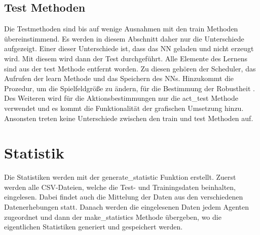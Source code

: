 \subsection{Test Methoden} \label{sec:Implementierung_test_Methode}
Die Testmethoden sind bis auf wenige Ausnahmen mit den train Methoden übereinstimmend. Es werden in diesem Abschnitt daher nur die Unterschiede aufgezeigt. Einer dieser Unterschiede ist, dass das NN geladen und nicht erzeugt wird. Mit diesem wird dann der Test durchgeführt. Alle Elemente des Lernens sind aus der test Methode entfernt worden. Zu diesen gehören der Scheduler, das Aufrufen der learn Methode und das Speichern des NNs.
Hinzukommt die Prozedur, um die Spielfeldgröße zu ändern, für die Bestimmung der Robustheit .
Des Weiteren wird für die Aktionsbestimmungen nur die act\_test Methode verwendet und es kommt die Funktionalität der grafischen Umsetzung hinzu.
Ansonsten treten keine Unterschiede zwischen den train und test Methoden auf.

\section{Statistik} \label{sec:Implementierung_Statistiken}
Die Statistiken werden mit der generate\_statistic Funktion erstellt.
Zuerst werden alle CSV-Dateien, welche die Test- und Trainingsdaten beinhalten, eingelesen. Dabei findet auch die Mittelung der Daten aus den verschiedenen Datenerhebungen  statt.
Danach werden die eingelesenen Daten jedem Agenten zugeordnet und dann der make\_statistics Methode übergeben, wo die eigentlichen Statistiken generiert und gespeichert werden.